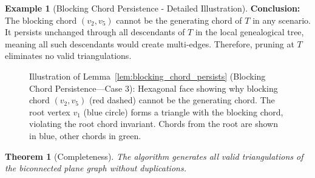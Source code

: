 \documentclass[12pt,a4paper]{article}
\newtheorem{theorem}{Theorem}
\theoremstyle{definition}
\newtheorem{example}{Example}
\theoremstyle{remark}
\begin{document}
\begin{example}[Blocking Chord Persistence - Detailed Illustration]
\textbf{Conclusion:} The blocking chord $(v_2, v_5)$ cannot be the generating chord of $T$ in any scenario. It persists unchanged through all descendants of $T$ in the local genealogical tree, meaning all such descendants would create multi-edges. Therefore, pruning at $T$ eliminates no valid triangulations.
\end{example}

\begin{figure}[H]
\centering
{}
\caption{Illustration of Lemma~\ref{lem:blocking_chord_persists} (Blocking Chord Persistence---Case 3): Hexagonal face showing why blocking chord $(v_2, v_5)$ (red dashed) cannot be the generating chord. The root vertex $v_1$ (blue circle) forms a triangle with the blocking chord, violating the root chord invariant. Chords from the root are shown in blue, other chords in green.}
\label{fig:blocking_chord_example}
\end{figure}

\begin{theorem}[Completeness]
\label{thm:completeness}
The algorithm generates all valid triangulations of the biconnected plane graph without duplications.
\end{theorem}
\end{document}
